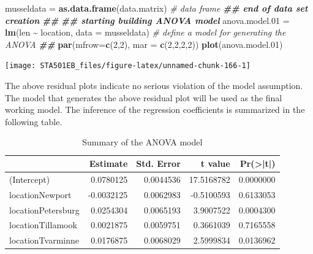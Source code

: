 \documentclass[
]{book}
\newenvironment{Shaded}{\begin{snugshade}}{\end{snugshade}}
\newcommand{\AttributeTok}[1]{\textcolor[rgb]{0.13,0.29,0.53}{#1}}
\newcommand{\CommentTok}[1]{\textcolor[rgb]{0.56,0.35,0.01}{\textit{#1}}}
\newcommand{\DecValTok}[1]{\textcolor[rgb]{0.00,0.00,0.81}{#1}}
\newcommand{\DocumentationTok}[1]{\textcolor[rgb]{0.56,0.35,0.01}{\textbf{\textit{#1}}}}
\newcommand{\FloatTok}[1]{\textcolor[rgb]{0.00,0.00,0.81}{#1}}
\newcommand{\FunctionTok}[1]{\textcolor[rgb]{0.13,0.29,0.53}{\textbf{#1}}}
\newcommand{\NormalTok}[1]{#1}
\newcommand{\OtherTok}[1]{\textcolor[rgb]{0.56,0.35,0.01}{#1}}
\newcommand{\SpecialCharTok}[1]{\textcolor[rgb]{0.81,0.36,0.00}{\textbf{#1}}}
\newcommand{\StringTok}[1]{\textcolor[rgb]{0.31,0.60,0.02}{#1}}
\begin{document}
\begin{Shaded}
\begin{Highlighting}[]
\NormalTok{musseldata }\OtherTok{=} \FunctionTok{as.data.frame}\NormalTok{(data.matrix)        }\CommentTok{\# data frame}
\DocumentationTok{\#\# end of data set creation}
\DocumentationTok{\#\#}
\DocumentationTok{\#\# starting building ANOVA model}
\NormalTok{anova.model}\FloatTok{.01} \OtherTok{=} \FunctionTok{lm}\NormalTok{(len }\SpecialCharTok{\textasciitilde{}}\NormalTok{ location, }\AttributeTok{data =}\NormalTok{ musseldata)  }\CommentTok{\# define a model for generating the ANOVA}
\DocumentationTok{\#\#}
\FunctionTok{par}\NormalTok{(}\AttributeTok{mfrow=}\FunctionTok{c}\NormalTok{(}\DecValTok{2}\NormalTok{,}\DecValTok{2}\NormalTok{), }\AttributeTok{mar =} \FunctionTok{c}\NormalTok{(}\DecValTok{2}\NormalTok{,}\DecValTok{2}\NormalTok{,}\DecValTok{2}\NormalTok{,}\DecValTok{2}\NormalTok{))}
\FunctionTok{plot}\NormalTok{(anova.model}\FloatTok{.01}\NormalTok{)}
\end{Highlighting}
\end{Shaded}

\begin{center}\texttt{[image: STA501EB\_files/figure-latex/unnamed-chunk-166-1]} \end{center}

The above residual plots indicate no serious violation of the model assumption. The model that generates the above residual plot will be used as the final working model. The inference of the regression coefficients is summarized in the following table.

\begin{Shaded}
\end{Shaded}

\begin{table}

\caption{\label{tab:unnamed-chunk-167}Summary of the ANOVA model}
\centering
\begin{tabular}[t]{l|r|r|r|r}
\hline
  & Estimate & Std. Error & t value & Pr(>|t|)\\
\hline
(Intercept) & 0.0780125 & 0.0044536 & 17.5168782 & 0.0000000\\
\hline
locationNewport & -0.0032125 & 0.0062983 & -0.5100593 & 0.6133053\\
\hline
locationPetersburg & 0.0254304 & 0.0065193 & 3.9007522 & 0.0004300\\
\hline
locationTillamook & 0.0021875 & 0.0059751 & 0.3661039 & 0.7165558\\
\hline
locationTvarminne & 0.0176875 & 0.0068029 & 2.5999834 & 0.0136962\\
\hline
\end{tabular}
\end{table}
\end{document}
